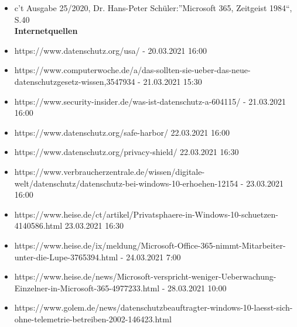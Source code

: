\begin{itemize}[leftmargin=0.4cm]

    \item c’t Ausgabe 25/2020, Dr. Hans-Peter Schüler:”Microsoft 365, Zeitgeist 1984“, S.40
\\

\textbf{Internetquellen}

    \item https://www.datenschutz.org/usa/ - 20.03.2021 16:00
    \item https://www.computerwoche.de/a/das-sollten-sie-ueber-das-neue-datenschutzgesetz-wissen,3547934 - 21.03.2021 15:30
    \item https://www.security-insider.de/was-ist-datenschutz-a-604115/ - 21.03.2021 16:00
    \item https://www.datenschutz.org/safe-harbor/ 22.03.2021 16:00
    \item https://www.datenschutz.org/privacy-shield/ 22.03.2021 16:30
    \item https://www.verbraucherzentrale.de/wissen/digitale-welt/datenschutz/datenschutz-bei-windows-10-erhoehen-12154 - 23.03.2021 16:00
    \item https://www.heise.de/ct/artikel/Privatsphaere-in-Windows-10-schuetzen-4140586.html 23.03.2021 16:30
    \item https://www.heise.de/ix/meldung/Microsoft-Office-365-nimmt-Mitarbeiter-unter-die-Lupe-3765394.html - 24.03.2021 7:00
    \item https://www.heise.de/news/Microsoft-verspricht-weniger-Ueberwachung-Einzelner-in-Microsoft-365-4977233.html - 28.03.2021 10:00
    \item https://www.golem.de/news/datenschutzbeauftragter-windows-10-laesst-sich-ohne-telemetrie-betreiben-2002-146423.html

\end{itemize}